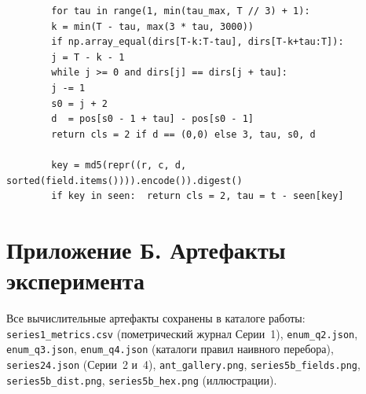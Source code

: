 \documentclass[12pt,a4paper]{article}
\begin{document}
	\begin{lstlisting}
		for tau in range(1, min(tau_max, T // 3) + 1):
		k = min(T - tau, max(3 * tau, 3000))
		if np.array_equal(dirs[T-k:T-tau], dirs[T-k+tau:T]):
		j = T - k - 1
		while j >= 0 and dirs[j] == dirs[j + tau]:
		j -= 1
		s0 = j + 2                      
		d  = pos[s0 - 1 + tau] - pos[s0 - 1]
		return cls = 2 if d == (0,0) else 3, tau, s0, d
		
		key = md5(repr((r, c, d, sorted(field.items()))).encode()).digest()
		if key in seen:  return cls = 2, tau = t - seen[key]
	\end{lstlisting}
	
	\section{Приложение Б. Артефакты эксперимента}
	Все вычислительные артефакты сохранены в каталоге работы:
	\texttt{series1\_metrics.csv} (пометрический журнал Серии~1),
	\texttt{enum\_q2.json}, \texttt{enum\_q3.json}, \texttt{enum\_q4.json}
	(каталоги правил наивного перебора), \texttt{series24.json} (Серии~2 и~4),
	\texttt{ant\_gallery.png}, \texttt{series5b\_fields.png},
	\texttt{series5b\_dist.png}, \texttt{series5b\_hex.png} (иллюстрации).
	
\end{document}
